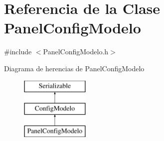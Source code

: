 \hypertarget{classPanelConfigModelo}{\section{\-Referencia de la \-Clase \-Panel\-Config\-Modelo}
\label{classPanelConfigModelo}
}


{\ttfamily \#include $<$\-Panel\-Config\-Modelo.\-h$>$}

\-Diagrama de herencias de \-Panel\-Config\-Modelo\begin{figure}[H]
\begin{center}
\leavevmode
\includegraphics[height=3.000000cm]{classPanelConfigModelo}
\end{center}
\end{figure}
